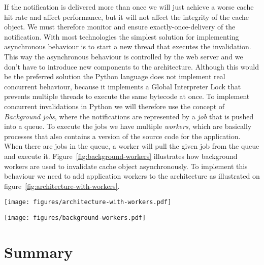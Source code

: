 If the notification is delivered more than once we will just achieve a worse cache hit rate and affect performance, but it will not affect the integrity of the cache object. We must therefore monitor and ensure exactly-once-delivery of the notification.
With most technologies the simplest solution for implementing asynchronous behaviour is to start a new thread that executes the invalidation. This way the asynchronous behaviour is controlled by the web server and we don't have to introduce new components to the architecture. Although this would be the preferred solution the Python language does not implement real concurrent behaviour, because it implements a Global Interpreter Lock that prevents multiple threads to execute the same bytecode at once.
To implement concurrent invalidations in Python we will therefore use the concept of \emph{Background jobs}, where the notifications are represented by a \emph{job} that is pushed into a queue. To execute the jobs we have multiple \emph{workers}, which are basically processes that also contains a version of the source code for the application. When there are jobs in the queue, a worker will pull the given job from the queue and execute it. Figure~\ref{fig:background-workers} illustrates how background workers are used to invalidate cache object asynchronously. To implement this behaviour we need to add application workers to the architecture as illustrated on figure~\ref{fig:architecture-with-workers}.

\begin{figure*}[ht!]
  \centering
  \texttt{[image: figures/architecture-with-workers.pdf]}
  \caption{The architecture required by a web application that uses Smache with automatic invalidation.}
  \label{fig:architecture-with-workers}
\end{figure*}

\begin{figure*}[ht!]
  \centering
  \texttt{[image: figures/background-workers.pdf]}
  \caption{How background workers are used do perform invalidation asynchronously.}
  \label{fig:background-workers}
\end{figure*}



\section{Summary}
\label{sec:invalidation-summary}

